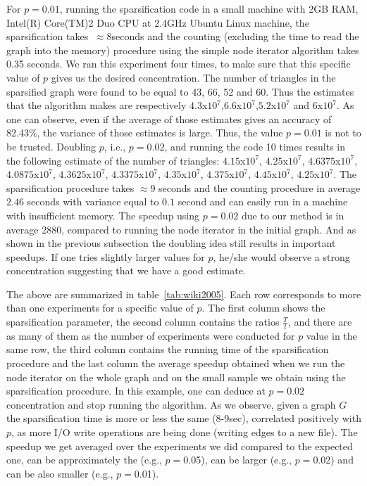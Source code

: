 \documentclass{llncs}
\begin{document}
For $p=0.01$, running the sparsification code in a small machine 
with 2GB RAM, Intel(R) Core(TM)2 Duo CPU at 2.4GHz Ubuntu Linux machine, the sparsification
takes $~\approx 8$seconds and the counting (excluding the time to read the graph into the memory)
procedure using the simple node iterator algorithm takes 0.35 seconds. 
We ran this experiment four times, to make sure that this specific value of $p$ 
gives us the desired concentration. 
The number of triangles in the sparsified graph were found to be equal to 43, 66, 52 and 60.
Thus the estimates that the algorithm makes are respectively $4.3$x$10^7$,$6.6$x$10^7$,$5.2$x$10^7$ and $6$x$10^7$.
As one can observe, even if the average of those estimates gives an accuracy of 82.43\%,
the variance of those estimates is large. Thus, the value $p=0.01$ is not to be trusted. 
Doubling $p$, i.e., $p=0.02$, and running the code 10 times results in the following estimate of the number of triangles:
$4.15$x$10^7$, $4.25$x$10^7$, $4.6375$x$10^7$, $4.0875$x$10^7$, $4.3625$x$10^7$, $4.3375$x$10^7$, $4.35$x$10^7$, $4.375$x$10^7$, $4.45$x$10^7$, $4.25$x$10^7$.
The sparsification procedure takes $\approx 9$ seconds and the counting procedure in average $2.46$ seconds with variance equal to $0.1$ second
and can easily run in a machine with insufficient memory.
The speedup using $p=0.02$ due to our method is in average 2880, compared to running the node iterator in the initial graph. 
And as shown in the previous subsection the doubling idea still results in important speedups. 
If one tries slightly larger values for $p$, he/she would observe a strong concentration suggesting that we have a good estimate. 

The above are summarized in table~\ref{tab:wiki2005}. Each row corresponds to more than one experiments for a specific value of $p$. 
The first column shows the sparsification parameter, the second column contains the ratios $\frac{T}{t}$, and there are 
as many of them as the number of experiments were conducted for $p$ value in the same row, the third column
contains the running time of the sparsification procedure and the last column the average speedup obtained when 
we run the node iterator on the whole graph and on the small sample we obtain using the sparsification procedure. 
In this example, one can deduce at $p=0.02$ concentration and stop running the algorithm. 
As we observe, given a graph $G$ the sparsification time is more or less the same (8-9sec), correlated positively
with $p$, as more I/O write operations are being done (writing edges to a new file). The speedup we get averaged
over the experiments we did compared to the expected one, can be approximately 
the (e.g., $p=$0.05), can be larger (e.g., $p=$0.02) and can be also smaller (e.g., $p=$0.01).
\end{document}
